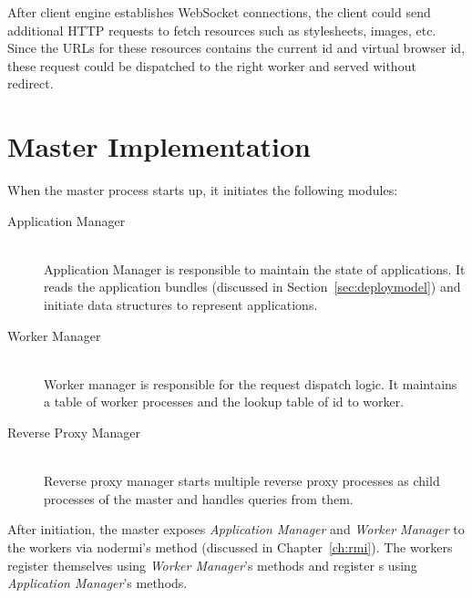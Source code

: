 After client engine establishes WebSocket connections, the client could send
additional HTTP requests to fetch resources such as stylesheets, images, etc.
Since the URLs for these resources contains the current \appins id and virtual
browser id, these request could be dispatched to the right worker and  served
without redirect.


\section{Master Implementation}

When the master process starts up, it initiates the following modules:

\begin{description}
\item[Application Manager] \hfill \\
Application Manager is responsible to maintain the state of applications. It
reads the application bundles (discussed in Section~\ref{sec:deploymodel}) and
initiate data structures to represent applications.

\item[Worker Manager] \hfill \\
Worker manager is responsible for the request dispatch logic.
It maintains a table of worker processes and
the lookup table of \appins id to worker.

\item[Reverse Proxy Manager] \hfill \\
Reverse proxy manager starts multiple reverse proxy processes as child
processes of the master and handles queries from them.
\end{description}

After initiation, the master exposes \emph{Application Manager} and
\emph{Worker Manager} to the workers via nodermi's   method
(discussed in Chapter~\ref{ch:rmi}). The workers register themselves
using \emph{Worker Manager}'s methods and register \appins{}s using
\emph{Application Manager}'s methods.



